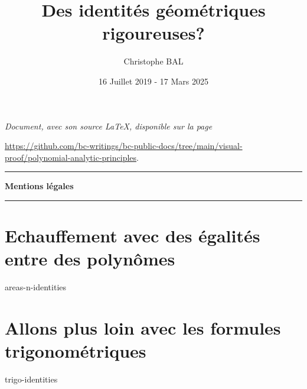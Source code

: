 \documentclass[12pt]{amsart}
\begin{document}
\title{Des identités {\og géométriques \fg} rigoureuses?}
\author{Christophe BAL}
\date{16 Juillet 2019 - 17 Mars 2025}

\maketitle

\begin{center}
	\itshape
	Document, avec son source \LaTeX, disponible sur la page

	\url{https://github.com/bc-writings/bc-public-docs/tree/main/visual-proof/polynomial-analytic-principles}.
\end{center}


\bigskip


\begin{center}
	\hrule\vspace{.3em}
	{
		\fontsize{1.35em}{1em}\selectfont
		\textbf{Mentions \og légales \fg}
	}

	\vspace{0.45em}
	\doclicenseThis
	\hrule
\end{center}


\bigskip


\setcounter{tocdepth}{1}
\tableofcontents



\newpage

\section{Echauffement avec des égalités entre des polynômes}

{areas-n-identities}



\newpage

\section{Allons plus loin avec les formules trigonométriques}

{trigo-identities}
\end{document}
